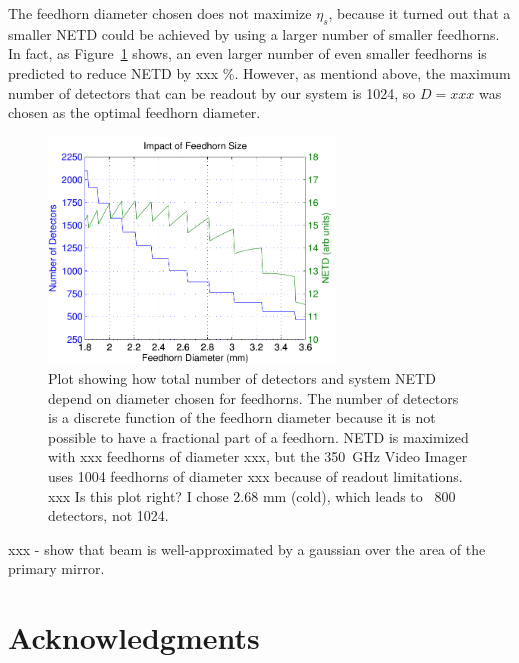 \documentclass[10pt,twocolumn,article]{memoir}
\newcommand*{\figref}[1]{Figure~\ref{#1}}
\newcommand*{\NETD}{{\small NETD}\xspace}
\newcommand*{\Imager}{350~GHz Video Imager\xspace}
\begin{document}
The feedhorn diameter chosen does not maximize $\eta_s$, because it turned out that a smaller \NETD could be achieved by using a larger number of smaller feedhorns.
In fact, as \figref{fig:netd-num-feeds} shows, an even larger number of even smaller feedhorns is predicted to reduce \NETD by xxx \%.
However, as mentiond above, the maximum number of detectors that can be readout by our system is 1024, so $D = xxx$ was chosen as the optimal feedhorn diameter.

\begin{figure}[th]
\centering
\includegraphics[width=3.0in]{images/netd_num_feeds.pdf}
\caption{Plot showing how total number of detectors and system \NETD depend on diameter chosen for feedhorns. The number of detectors is a discrete function of the feedhorn diameter because it is not possible to have a fractional part of a feedhorn. \NETD is maximized with xxx feedhorns of diameter xxx, but the \Imager uses 1004 feedhorns of diameter xxx because of readout limitations. xxx Is this plot right? I chose 2.68 mm (cold), which leads to ~800 detectors, not 1024.}
\label{fig:netd-num-feeds}
\end{figure}

xxx - show that beam is well-approximated by a gaussian over the area of the primary mirror.

%


\section{Acknowledgments}
\end{document}
